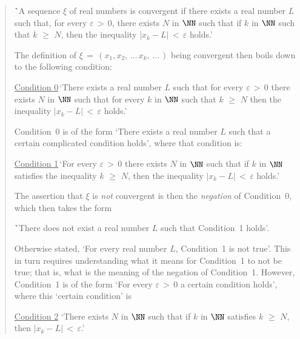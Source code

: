 \begin{quotation}
{\VA

        \h `A sequence ${\xi}$ of real numbers is convergent if there exists a real number $L$ such that,
for every ${\varepsilon}\,>\,0$,
    there exists $N$ in ${\NN}$ such that if $k$ in ${\NN}$ such that $k\,\,{\geq}\,\,N$, then the inequality $|x_{k}-L|\,<\,{\varepsilon}$ holds.'

\VA

\noindent The definition of ${\xi} \,=\, (x_{1}, x_{2},\,{\ldots}\,x_{k},\,{\ldots}\,)$ being convergent then boils down to the following condition:

\VA

        \h \underline{Condition 0}\,`There exists a real number $L$ such that for every ${\varepsilon}\,>\,0$
    there exists $N$ in ${\NN}$ such that for every $k$ in ${\NN}$ such that $k\,\,{\geq}\,\,N$ then the inequality  $|x_{k}-L|\,<\,{\varepsilon}$ holds.'

\VA

\noindent Condition~0 is of the form `There exists a real number $L$ such that a certain complicated condition holds', where that condition is:

\VA

        \h \underline{Condition 1}\,`For every ${\varepsilon}\,>\,0$ there exists $N$ in ${\NN}$ such that
    if $k$ in ${\NN}$ satisfies the inequality  $k\,\,{\geq}\,\,N$, then the inequality $|x_{k}-L|\,<\,{\varepsilon}$ holds.'

\VA

\noindent The assertion that ${\xi}$ is {\em not} convergent is then the {\em negation} of Condition~0, which then takes the form

\VA

        \h `There does not exist a real number $L$ such that Condition~1 holds'.

\VA

\noindent Otherwise stated, `For every real number $L$, Condition~1 is not true'.
    This in turn requires understanding what it means for Condition~1 to not be true; 
    that is, what is the meaning of the negation of Condition~1. However, Condition~1 is of the form
    `For every ${\varepsilon}\,>\,0$ a certain condition holds', where this `certain condition' is

\VA

        \h \underline{Condition 2} `There exists $N$ in ${\NN}$ such that if $k$ in ${\NN}$
    satisfies $k\,\,{\geq}\,\,N$, then $|x_{k}-L|\,<\,{\varepsilon}$.'

\VA

}
\end{quotation}
